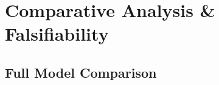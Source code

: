 
\chapter{Comparative Analysis \& Falsifiability}
\label{ch:comparative}

\section{Full Model Comparison}
\label{sec:model_comparison}


